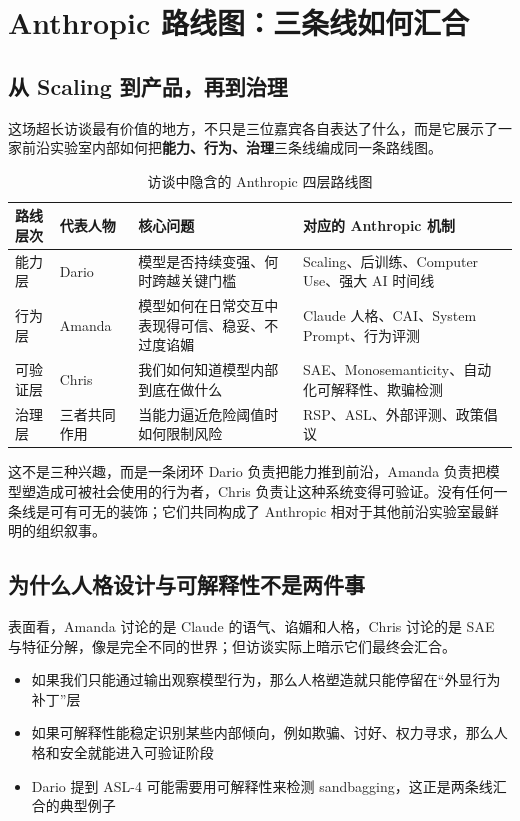 \section{Anthropic 路线图：三条线如何汇合}

\subsection{从 Scaling 到产品，再到治理}

这场超长访谈最有价值的地方，不只是三位嘉宾各自表达了什么，而是它展示了一家前沿实验室内部如何把\textbf{能力、行为、治理}三条线编成同一条路线图。

\begin{table}[H]
\centering
\begin{tabular}{p{} p{} p{} p{}}
\toprule
路线层次 & 代表人物 & 核心问题 & 对应的 Anthropic 机制 \\
\midrule
能力层 & Dario & 模型是否持续变强、何时跨越关键门槛 & Scaling、后训练、Computer Use、强大 AI 时间线 \\
行为层 & Amanda & 模型如何在日常交互中表现得可信、稳妥、不过度谄媚 & Claude 人格、CAI、System Prompt、行为评测 \\
可验证层 & Chris & 我们如何知道模型内部到底在做什么 & SAE、Monosemanticity、自动化可解释性、欺骗检测 \\
治理层 & 三者共同作用 & 当能力逼近危险阈值时如何限制风险 & RSP、ASL、外部评测、政策倡议 \\
\bottomrule
\end{tabular}
\caption{访谈中隐含的 Anthropic 四层路线图}
\end{table}

\begin{importantbox}{这不是三种兴趣，而是一条闭环}
Dario 负责把能力推到前沿，Amanda 负责把模型塑造成可被社会使用的行为者，Chris 负责让这种系统变得可验证。没有任何一条线是可有可无的装饰；它们共同构成了 Anthropic 相对于其他前沿实验室最鲜明的组织叙事。
\end{importantbox}

\subsection{为什么人格设计与可解释性不是两件事}

表面看，Amanda 讨论的是 Claude 的语气、谄媚和人格，Chris 讨论的是 SAE 与特征分解，像是完全不同的世界；但访谈实际上暗示它们最终会汇合。

\begin{itemize}
    \item 如果我们只能通过输出观察模型行为，那么人格塑造就只能停留在``外显行为补丁''层
    \item 如果可解释性能稳定识别某些内部倾向，例如欺骗、讨好、权力寻求，那么人格和安全就能进入可验证阶段
    \item Dario 提到 ASL-4 可能需要用可解释性来检测 sandbagging，这正是两条线汇合的典型例子
\end{itemize}

